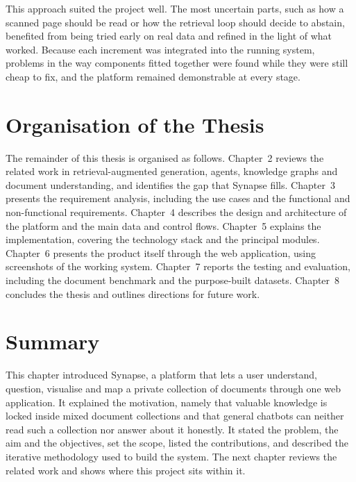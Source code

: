 This approach suited the project well. The most uncertain parts, such as how a
scanned page should be read or how the retrieval loop should decide to abstain,
benefited from being tried early on real data and refined in the light of what
worked. Because each increment was integrated into the running system, problems
in the way components fitted together were found while they were still cheap to
fix, and the platform remained demonstrable at every stage.

\section{Organisation of the Thesis}

The remainder of this thesis is organised as follows. Chapter~2 reviews the
related work in retrieval-augmented generation, agents, knowledge graphs and
document understanding, and identifies the gap that Synapse fills.
Chapter~3 presents the requirement analysis, including the use cases and the
functional and non-functional requirements. Chapter~4 describes the design and
architecture of the platform and the main data and control flows. Chapter~5
explains the implementation, covering the technology stack and the principal
modules. Chapter~6 presents the product itself through the web application, using
screenshots of the working system. Chapter~7 reports the testing and evaluation,
including the document benchmark and the purpose-built datasets. Chapter~8
concludes the thesis and outlines directions for future work.

\section{Summary}

This chapter introduced Synapse, a platform that lets a user understand,
question, visualise and map a private collection of documents through one web
application. It explained the motivation, namely that valuable knowledge is
locked inside mixed document collections and that general chatbots can neither
read such a collection nor answer about it honestly. It stated the problem, the
aim and the objectives, set the scope, listed the contributions, and described
the iterative methodology used to build the system. The next chapter reviews the
related work and shows where this project sits within it.
